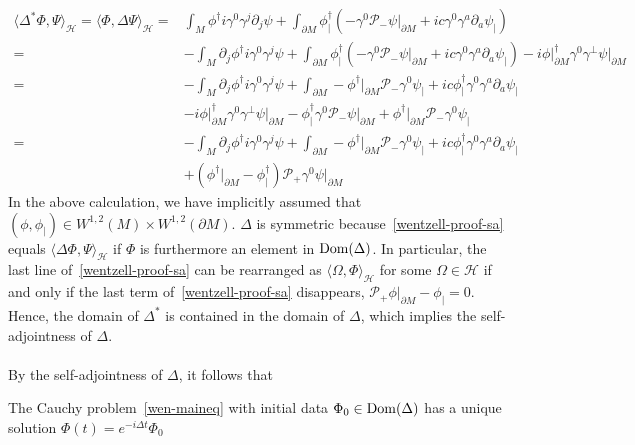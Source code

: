 \begin{equation}\label{wentzell-proof-sa}
\begin{split}
\langle \Delta^*\Phi, \Psi \rangle_\mathcal{H} =
\langle \Phi, \Delta \Psi \rangle _\mathcal{H}
 = & \int_M \phi^\dagger i \gamma^0 \gamma^j \partial_j \psi 
+ \int_{\partial M} \phi^\dagger_|(  -\gamma^0\mathcal{P}_- \psi\vert_{\partial M} + ic \gamma^0 \gamma^a \partial_a\psi_|)   \\
 = & - \int_M \partial_j \phi^\dagger i \gamma^0 \gamma^j \psi 
+ \int_{\partial M} \phi^\dagger_|(-\gamma^0 \mathcal{P}_- \psi\vert_{\partial M} + ic \gamma^0 \gamma^a \partial_a  \psi_|) 
- i\phi\vert_{\partial M}^\dagger \gamma^0 \gamma^\bot \psi\vert_{\partial M}   \\
= &
- \int_M \partial_j \phi^\dagger i \gamma^0 \gamma^j \psi 
+ \int_{\partial M} - \phi^\dagger\vert_{\partial M}\mathcal{P}_- \gamma^0 \psi_| + ic \phi^\dagger_|\gamma^0 \gamma^a \partial_a  \psi_|  \\
& - i \phi\vert_{\partial M}^\dagger \gamma^0 \gamma^\bot \psi\vert_{\partial M} 
-\phi_|^\dagger \gamma^0 \mathcal{P}_- \psi\vert_{\partial M} 
+ \phi^\dagger\vert_{\partial M}\mathcal{P}_- \gamma^0 \psi_| \\
= &
- \int_M \partial_j \phi^\dagger i \gamma^0 \gamma^j \psi 
+ \int_{\partial M} - \phi^\dagger\vert_{\partial M}\mathcal{P}_- \gamma^0 \psi_| + ic \phi^\dagger_|\gamma^0 \gamma^a \partial_a  \psi_| \\
& + (\phi^\dagger\vert_{\partial M} - \phi_|^\dagger)\mathcal{P}_+ \gamma^0 \psi\vert_{\partial M}
\end{split}
\end{equation}
In the above calculation, we have implicitly assumed that $(\phi, \phi_|)\in W^{1,2}(M)\times W^{1,2}(\partial M)$.
$\Delta$ is symmetric because~\cref{wentzell-proof-sa} equals $\langle \Delta\Phi, \Psi\rangle_\mathcal{H}$ if $\Phi$ is furthermore an element in $\mathrm{Dom}(\Delta)$.
In particular, the last line of~\cref{wentzell-proof-sa} can be rearranged as $\langle\Omega,\Phi\rangle_\mathcal{H}$ for some $\Omega\in\mathcal{H}$ if and only if the last term of~\cref{wentzell-proof-sa} disappears, \ie
$\mathcal{P}_+\phi\vert_{\partial M} - \phi_| = 0$.
Hence, the domain of $\Delta^*$ is contained in the domain of $\Delta$, which implies the self-adjointness of $\Delta$.\\\\
By the self-adjointness of $\Delta$, it follows that 
\begin{proposition}\label{wen-propwellposedness}
The Cauchy problem~\cref{wen-maineq} with initial data $\Phi_0\in\mathrm{Dom}(\Delta)$ has a unique solution $\Phi(t) = e^{-i\Delta t}\Phi_0 $
\end{proposition}

